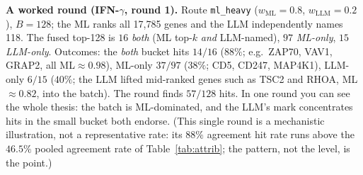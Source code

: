 \documentclass[11pt]{article}
\begin{document}
\begin{center}
\end{center}

\noindent
\textbf{A worked round (IFN-$\gamma$, round 1).} Route \texttt{ml\_heavy}
($w_{\mathrm{ML}}{=}0.8$, $w_{\mathrm{LLM}}{=}0.2$), $B{=}128$; the ML ranks all 17{,}785 genes and the LLM
independently names 118. The fused top-128 is $16$ \emph{both} (ML top-$k$ \emph{and} LLM-named), $97$
\emph{ML-only}, $15$ \emph{LLM-only}. Outcomes: the \emph{both} bucket hits $14/16$ ($88\%$; e.g.\ ZAP70,
VAV1, GRAP2, all ML${\approx}0.98$), ML-only $37/97$ ($38\%$; CD5, CD247, MAP4K1), LLM-only $6/15$ ($40\%$;
the LLM lifted mid-ranked genes such as TSC2 and RHOA, ML${\approx}0.82$, into the batch). The round finds
$57/128$ hits. In one round you can see the whole thesis: the batch is ML-dominated, and the LLM's mark
concentrates hits in the small bucket both endorse. (This single round is a mechanistic illustration, not
a representative rate: its $88\%$ agreement hit rate runs above the $46.5\%$ pooled agreement rate of
Table~\ref{tab:attrib}; the pattern, not the level, is the point.)
\end{document}
